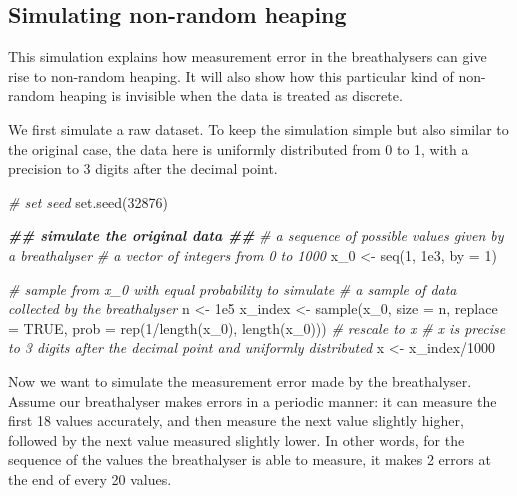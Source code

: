 \documentclass[
  11pt,
]{article}
\newenvironment{Shaded}{\begin{snugshade}}{\end{snugshade}}
\newcommand{\AttributeTok}[1]{\textcolor[rgb]{0.77,0.63,0.00}{#1}}
\newcommand{\CommentTok}[1]{\textcolor[rgb]{0.56,0.35,0.01}{\textit{#1}}}
\newcommand{\ConstantTok}[1]{\textcolor[rgb]{0.00,0.00,0.00}{#1}}
\newcommand{\DecValTok}[1]{\textcolor[rgb]{0.00,0.00,0.81}{#1}}
\newcommand{\DocumentationTok}[1]{\textcolor[rgb]{0.56,0.35,0.01}{\textbf{\textit{#1}}}}
\newcommand{\FloatTok}[1]{\textcolor[rgb]{0.00,0.00,0.81}{#1}}
\newcommand{\FunctionTok}[1]{\textcolor[rgb]{0.00,0.00,0.00}{#1}}
\newcommand{\NormalTok}[1]{#1}
\newcommand{\OtherTok}[1]{\textcolor[rgb]{0.56,0.35,0.01}{#1}}
\newcommand{\SpecialCharTok}[1]{\textcolor[rgb]{0.00,0.00,0.00}{#1}}
\begin{document}
\hypertarget{simulating-non-random-heaping}{%
\subsection*{Simulating non-random
heaping}\label{simulating-non-random-heaping}}

This simulation explains how measurement error in the breathalysers can
give rise to non-random heaping. It will also show how this particular
kind of non-random heaping is invisible when the data is treated as
discrete.

We first simulate a raw dataset. To keep the simulation simple but also
similar to the original case, the data here is uniformly distributed
from 0 to 1, with a precision to 3 digits after the decimal point.

\begin{Shaded}
\begin{Highlighting}[]
\CommentTok{\# set seed}
\FunctionTok{set.seed}\NormalTok{(}\DecValTok{32876}\NormalTok{)}

\DocumentationTok{\#\# simulate the original data \#\#}
\CommentTok{\# a sequence of possible values given by a breathalyser}
\CommentTok{\# a vector of integers from 0 to 1000}
\NormalTok{x\_0 }\OtherTok{\textless{}{-}} \FunctionTok{seq}\NormalTok{(}\DecValTok{1}\NormalTok{, }\FloatTok{1e3}\NormalTok{, }\AttributeTok{by =} \DecValTok{1}\NormalTok{)}

\CommentTok{\# sample from x\_0 with equal probability to simulate}
\CommentTok{\# a sample of data collected by the breathalyser}
\NormalTok{n }\OtherTok{\textless{}{-}}  \FloatTok{1e5}
\NormalTok{x\_index }\OtherTok{\textless{}{-}} \FunctionTok{sample}\NormalTok{(x\_0, }\AttributeTok{size =}\NormalTok{ n, }\AttributeTok{replace =} \ConstantTok{TRUE}\NormalTok{,}
            \AttributeTok{prob =} \FunctionTok{rep}\NormalTok{(}\DecValTok{1}\SpecialCharTok{/}\FunctionTok{length}\NormalTok{(x\_0), }\FunctionTok{length}\NormalTok{(x\_0)))}
\CommentTok{\# rescale to x}
\CommentTok{\# x is precise to 3 digits after the decimal point and uniformly distributed}
\NormalTok{x }\OtherTok{\textless{}{-}}\NormalTok{ x\_index}\SpecialCharTok{/}\DecValTok{1000}
\end{Highlighting}
\end{Shaded}

Now we want to simulate the measurement error made by the breathalyser.
Assume our breathalyser makes errors in a periodic manner: it can
measure the first 18 values accurately, and then measure the next value
slightly higher, followed by the next value measured slightly lower. In
other words, for the sequence of the values the breathalyser is able to
measure, it makes 2 errors at the end of every 20 values.
\end{document}
